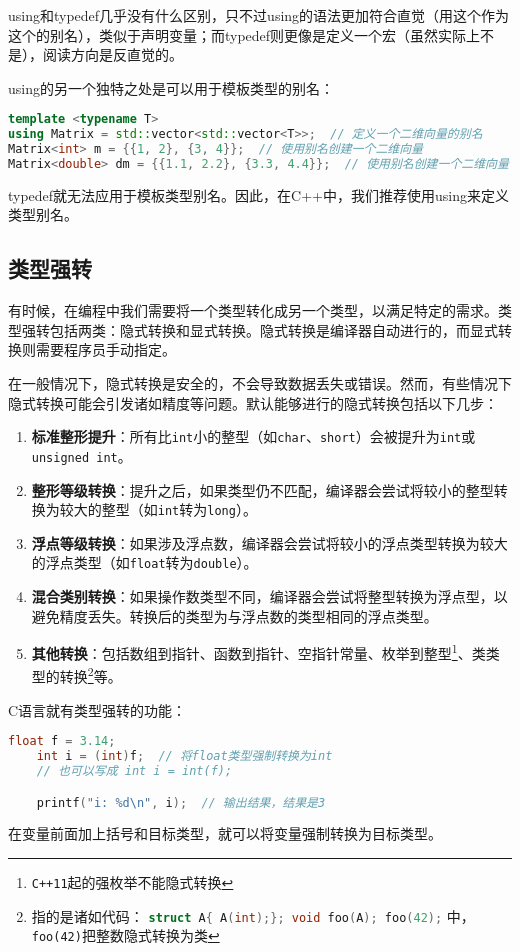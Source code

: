 using和typedef几乎没有什么区别，只不过using的语法更加符合直觉（用这个作为这个的别名），类似于声明变量；而typedef则更像是定义一个宏（虽然实际上不是），阅读方向是反直觉的。

using的另一个独特之处是可以用于模板类型的别名：
\begin{lstlisting}[language=C++]
template <typename T>
using Matrix = std::vector<std::vector<T>>;  // 定义一个二维向量的别名
Matrix<int> m = {{1, 2}, {3, 4}};  // 使用别名创建一个二维向量
Matrix<double> dm = {{1.1, 2.2}, {3.3, 4.4}};  // 使用别名创建一个二维向量
\end{lstlisting}
typedef就无法应用于模板类型别名。因此，在C++中，我们推荐使用using来定义类型别名。

\subsection{类型强转}

有时候，在编程中我们需要将一个类型转化成另一个类型，以满足特定的需求。类型强转包括两类：隐式转换和显式转换。隐式转换是编译器自动进行的，而显式转换则需要程序员手动指定。

在一般情况下，隐式转换是安全的，不会导致数据丢失或错误。然而，有些情况下隐式转换可能会引发诸如精度等问题。默认能够进行的隐式转换包括以下几步：
\begin{enumerate}
  \item \textbf{标准整形提升}：所有比\texttt{int}小的整型（如\texttt{char}、\texttt{short}）会被提升为\texttt{int}或\texttt{unsigned int}。
  \item \textbf{整形等级转换}：提升之后，如果类型仍不匹配，编译器会尝试将较小的整型转换为较大的整型（如\texttt{int}转为\texttt{long}）。
  \item \textbf{浮点等级转换}：如果涉及浮点数，编译器会尝试将较小的浮点类型转换为较大的浮点类型（如\texttt{float}转为\texttt{double}）。
  \item \textbf{混合类别转换}：如果操作数类型不同，编译器会尝试将整型转换为浮点型，以避免精度丢失。转换后的类型为与浮点数的类型相同的浮点类型。
  \item \textbf{其他转换}：包括数组到指针、函数到指针、空指针常量、枚举到整型\footnote{\texttt{C++11}起的强枚举不能隐式转换}、类类型的转换\footnote{指的是诸如代码： \lstinline[language=c++]|struct A{ A(int);}; void foo(A); foo(42);| 中，\texttt{foo(42)}把整数隐式转换为类}等。
\end{enumerate}

C语言就有类型强转的功能：
\begin{lstlisting}[language=C++]
    float f = 3.14;
    int i = (int)f;  // 将float类型强制转换为int
    // 也可以写成 int i = int(f);

    printf("i: %d\n", i);  // 输出结果，结果是3
\end{lstlisting}
在变量前面加上括号和目标类型，就可以将变量强制转换为目标类型。


